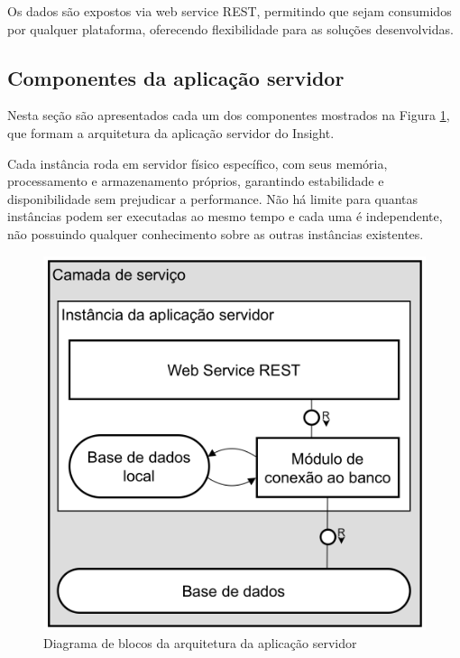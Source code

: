 \documentclass[english,brazilian]{UNISINOSmonografia}
\begin{document}
Os dados são expostos via web service REST, permitindo que sejam consumidos por qualquer plataforma, oferecendo flexibilidade para as soluções desenvolvidas. 






\subsection{Componentes da aplicação servidor}\label{componentesAplicacaoServidor}
Nesta seção são apresentados cada um dos componentes mostrados na Figura \ref{fig:arquiteturaInstancia}, que formam a arquitetura da aplicação servidor do Insight.

Cada instância roda em servidor físico específico, com seus memória, processamento e armazenamento próprios, garantindo estabilidade e disponibilidade sem prejudicar a performance. Não há limite para quantas instâncias podem ser executadas ao mesmo tempo e cada uma é independente, não possuindo qualquer conhecimento sobre as outras instâncias existentes.

\FloatBarrier
\begin{figure}[!ht]
	\caption{Diagrama de blocos da arquitetura da aplicação servidor}
	\label{fig:arquiteturaInstancia}
	\centering%
	\begin{minipage}{.5\textwidth}
		\includegraphics[width=\textwidth]{imgs/arquiteturaInstancia.png}
	\end{minipage}
\end{figure}
\FloatBarrier
\end{document}
